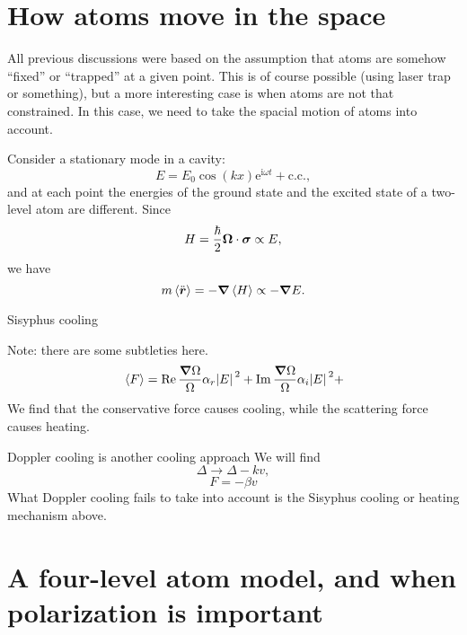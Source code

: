 \documentclass[hyperref, a4paper]{article}
\newcommand*{\ii}{\mathrm{i}}
\newcommand*{\ee}{\mathrm{e}}
\begin{document}
\section{How atoms move in the space}

All previous discussions were based on the assumption that atoms are somehow ``fixed'' or ``trapped'' at a 
given point. This is of course possible (using laser trap or something), but a more interesting case is when 
atoms are not that constrained. In this case, we need to take the spacial motion of atoms into account.

Consider a stationary mode in a cavity:
\begin{equation}
    E = E_0 \cos(kx) \ee^{\ii \omega t} + \text{c.c.},
\end{equation}
and at each point the energies of the ground state and the excited state of a two-level atom are different.
Since 
\begin{equation}
    H = \frac{\hbar}{2} \vb*{\Omega} \cdot \vb*{\sigma} \propto E,
\end{equation}
we have 
\begin{equation}
    m \expval*{\ddot{\vb*{r}}} = - {\grad \expval*{H}} \propto - \grad{E}.
\end{equation}

Sisyphus cooling

Note: there are some subtleties here. 
\begin{equation}
    \expval*{F} = \Re \frac{\grad \Omega}{\Omega} \alpha_r \abs*{E}^2 + 
    \Im \frac{\grad \Omega}{\Omega} \alpha_i \abs*{E}^2 +
\end{equation}
We find that the conservative force causes cooling, while the scattering force causes heating.

Doppler cooling is another cooling approach
We will find 
\begin{equation}
    \Delta \to \Delta - k v, 
\end{equation}
\begin{equation}
    F = - \beta v
\end{equation}
What Doppler cooling fails to take into account is the Sisyphus cooling or heating mechanism above.

\section{A four-level atom model, and when polarization is important}
\end{document}

